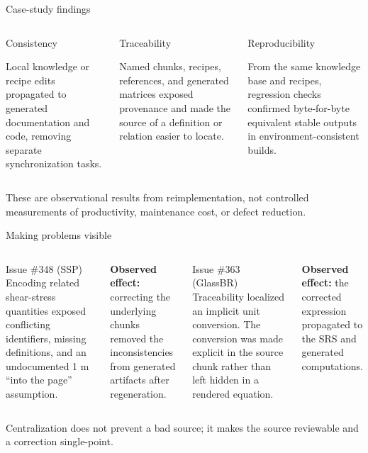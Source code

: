 \documentclass[aspectratio=169,10pt]{beamer}
\newcommand{\claim}[1]{%
  \begin{center}
    \setlength{\fboxsep}{7pt}%
    \colorbox{drasilblue!9}{\parbox{0.88\linewidth}{\centering #1}}%
  \end{center}
}
\begin{document}
\begin{frame}{Case-study findings}
\small
\begin{columns}[T,onlytextwidth]
\begin{block}{Consistency}
\begin{minipage}[t][2.35cm][t]{\linewidth}
\raggedright
Local knowledge or recipe edits propagated to generated documentation and code,
removing separate synchronization tasks.
\end{minipage}
\end{block}
\begin{block}{Traceability}
\begin{minipage}[t][2.35cm][t]{\linewidth}
\raggedright
Named chunks, recipes, references, and generated matrices exposed provenance and
made the source of a definition or relation easier to locate.
\end{minipage}
\end{block}
\begin{block}{Reproducibility}
\begin{minipage}[t][2.35cm][t]{\linewidth}
\raggedright
From the same knowledge base and recipes, regression checks confirmed
byte-for-byte equivalent stable outputs in environment-consistent builds.
\end{minipage}
\end{block}
\end{columns}

\vspace{0.65em}
\claim{These are observational results from reimplementation, not controlled measurements of productivity, maintenance cost, or defect reduction.}
\end{frame}

\begin{frame}{Making problems visible}
\begin{columns}[T,onlytextwidth]
\begin{block}{Issue \#348 (SSP)}
Encoding related shear-stress quantities exposed conflicting identifiers,
missing definitions, and an undocumented 1 m ``into the page'' assumption.
\end{block}
\textbf{Observed effect:} correcting the underlying chunks removed the
inconsistencies from generated artifacts after regeneration.
\begin{block}{Issue \#363 (GlassBR)}
Traceability localized an implicit unit conversion. The conversion was made
explicit in the source chunk rather than left hidden in a rendered equation.
\end{block}
\textbf{Observed effect:} the corrected expression propagated to the SRS and
generated computations.
\end{columns}
\vspace{0.55em}
\claim{Centralization does not prevent a bad source; it makes the source reviewable and a correction single-point.}
\end{frame}
\end{document}
